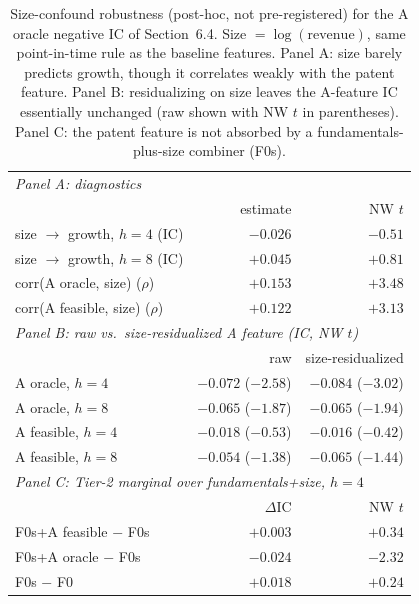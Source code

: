 \documentclass[11pt]{article}
\begin{document}
\begin{table}[htbp]
  \centering
  \caption{Size-confound robustness (post-hoc, not pre-registered) for the A oracle negative IC of Section~6.4. Size $=\log(\text{revenue})$, same point-in-time rule as the baseline features. Panel A: size barely predicts growth, though it correlates weakly with the patent feature. Panel B: residualizing on size leaves the A-feature IC essentially unchanged (raw shown with NW $t$ in parentheses). Panel C: the patent feature is not absorbed by a fundamentals-plus-size combiner (F0s).}
  \label{tab:size}
  \begin{tabular}{lrr}
    \toprule
    \multicolumn{3}{l}{\emph{Panel A: diagnostics}} \\
    & estimate & NW $t$ \\
    \midrule
    size $\to$ growth, $h=4$ (IC) & $-0.026$ & $-0.51$ \\
    size $\to$ growth, $h=8$ (IC) & $+0.045$ & $+0.81$ \\
    corr(A oracle, size) ($\rho$) & $+0.153$ & $+3.48$ \\
    corr(A feasible, size) ($\rho$) & $+0.122$ & $+3.13$ \\
    \midrule
    \multicolumn{3}{l}{\emph{Panel B: raw vs.\ size-residualized A feature (IC, NW $t$)}} \\
    & raw & size-residualized \\
    \midrule
    A oracle, $h=4$ & $-0.072$ ($-2.58$) & $-0.084$ ($-3.02$) \\
    A oracle, $h=8$ & $-0.065$ ($-1.87$) & $-0.065$ ($-1.94$) \\
    A feasible, $h=4$ & $-0.018$ ($-0.53$) & $-0.016$ ($-0.42$) \\
    A feasible, $h=8$ & $-0.054$ ($-1.38$) & $-0.065$ ($-1.44$) \\
    \midrule
    \multicolumn{3}{l}{\emph{Panel C: Tier-2 marginal over fundamentals+size, $h=4$}} \\
    & $\Delta$IC & NW $t$ \\
    \midrule
    F0s+A feasible $-$ F0s & $+0.003$ & $+0.34$ \\
    F0s+A oracle $-$ F0s & $-0.024$ & $-2.32$ \\
    F0s $-$ F0 & $+0.018$ & $+0.24$ \\
    \bottomrule
  \end{tabular}
\end{table}
\end{document}
